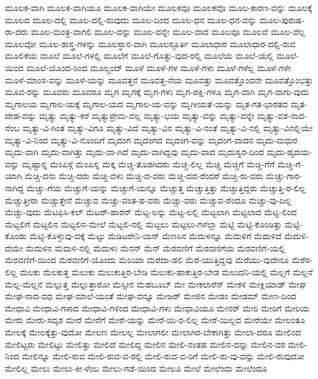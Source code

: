 {ಮೂಲಕ-ವಾಗಿ
ಮೂಲಕ-ವಾಗಿಯೂ
ಮೂಲಕ-ವಾಗಿಯೇ
ಮೂಲಕವೂ
ಮೂಲಕವೊ
ಮೂಲ-ಕಾರಣ-ವನ್ನು
ಮೂಲಕ್ಕೆ
ಮೂಲದ
ಮೂಲ-ದಲ್ಲಿ
ಮೂಲ-ದಲ್ಲಿ-ರುವುದು
ಮೂಲ-ದಿಂದ
ಮೂಲ-ಧನ
ಮೂಲ-ಧನ-ವನ್ನು
ಮೂಲ-ಪುರುಷ-ರಾ-ದರು
ಮೂಲ-ಮಂತ್ರ-ವಾಗಲಿ
ಮೂಲ-ವನ್ನು
ಮೂಲ-ವನ್ನೇ
ಮೂಲ-ವಾದ
ಮೂಲವೂ
ಮೂಲವೆ
ಮೂಲ-ವೆಲ್ಲ
ಮೂಲವೋ
ಮೂಲ-ಶಾಸ್ತ್ರ-ಗಳನ್ನು
ಮೂಲಸ್ಥಾನ-ವಾಗಿ
ಮೂಲಸ್ಫೂರ್ತಿ
ಮೂಲಾಧಾರ
ಮೂಲಾಧಾರ-ದಲ್ಲಿ-ರುವ
ಮೂಲಿಕೆಯ
ಮೂಲೆ
ಮೂಲೆ-ಗಳಲ್ಲಿ
ಮೂಲೆಗೆ
ಮೂಲೆ-ಗೊತ್ತು-ವುದ-ರಲ್ಲಿ
ಮೂಲೆಯ
ಮೂಲೆ-ಯಲ್ಲಿ
ಮೂಲೆ-ಯಿಂದ
ಮೂಲೆ-ಯೊಂದ-ರಿಂದ
ಮೂಲ್ಚಂದ್
ಮೂಳೆ
ಮೂಳೆ-ಗಳ
ಮೂಳೆ-ಗಳು
ಮೂಳೆ-ಗಳೆಲ್ಲ
ಮೂಳೆ-ಗಳೇ
ಮೂಳೆ-ಮಾಂಸ-ವನ್ನು
ಮೂಳೆ-ಯನ್ನು
ಮೂವತ್ತನೆ
ಮೂವತ್ತ-ನೆಯ
ಮೂವತ್ತು
ಮೂವತ್ತೊಂದನೇ
ಮೂವತ್ತೊಂಭತ್ತು
ಮೂವ-ರನ್ನು
ಮೂವರು
ಮೂವರೂ
ಮೃಗ
ಮೃಗಕ್ಕೆ
ಮೃಗ-ಗಳು
ಮೃಗ-ಪಕ್ಷಿ-ಗಳೂ
ಮೃಗ-ವಾಗಿ
ಮೃಗ-ವಾಗು-ವುದು
ಮೃಗಾಲಯ
ಮೃಗಾಲ-ಯಕ್ಕೆ
ಮೃಗಾಲ-ಯದ
ಮೃಗಾಲ-ಯ-ವನ್ನು
ಮೃಗೀಯತೆ-ಯನ್ನು
ಮೃತ-ಗತ-ಭಾರತದ
ಮೃತ-ದೇಹ-ವನ್ನು
ಮೃತ್ಯು
ಮೃತ್ಯು-ಕರೆ
ಮೃತ್ಯುಪ್ರೇಮ-ವಲ್ಲ
ಮೃತ್ಯು-ಭಯ
ಮೃತ್ಯು-ವನ್ನು
ಮೃತ್ಯು-ವನ್ನೇ
ಮೃತ್ಯು-ವಶ-ನಾದ-ನೆಂಬ
ಮೃತ್ಯು-ವಿ-ಗಿಂತ
ಮೃತ್ಯು-ವಿಗೂ
ಮೃತ್ಯು-ವಿದೆ
ಮೃತ್ಯು-ವಿನ
ಮೃತ್ಯು-ವಿ-ನಂತೆ
ಮೃತ್ಯು-ವಿ-ನಲ್ಲಿ
ಮೃತ್ಯು-ವಿನಲ್ಲಿಯೇ
ಮೃತ್ಯು-ವಿ-ನಿಂದ
ಮೃತ್ಯು-ವಿ-ನೊಂದಿಗೆ
ಮೃದಂಗ
ಮೃದಂಗದ
ಮೃದಂಗ-ವನ್ನು
ಮೃದಂಗ-ವಾದನ
ಮೃದು-ಮಧುರ
ಮೃದು-ವಾಗಿ
ಮೃದು-ವಾಗಿತ್ತು
ಮೃದು-ವಾ-ಗಿದೆ
ಮೃದು-ವಾಗಿದ್ದವು
ಮೃದು-ವಾದ
ಮೃದುಸ್ವರ-ದಿಂದ
ಮೃದು-ಹೃದಯ-ವನ್ನು
ಮೃಷ್ಟಾನ್ನ
ಮೆಂಪಿಸ್ಗೆ
ಮೆಂಪಿಸ್ನ
ಮೆಕ್ಕ
ಮೆಚ್ಚ-ತೊಡಗಿದರು
ಮೆಚ್ಚ-ಲಿಲ್ಲ
ಮೆಚ್ಚಿ
ಮೆಚ್ಚಿಗೆ
ಮೆಚ್ಚಿ-ಗೆಗೆ
ಮೆಚ್ಚಿ-ಗೆ-ಯಾಗಿ
ಮೆಚ್ಚಿ-ದನು
ಮೆಚ್ಚಿ-ದರು
ಮೆಚ್ಚಿ-ದಳು
ಮೆಚ್ಚಿ-ದ-ವರು
ಮೆಚ್ಚಿ-ದವ-ರೆಂದರೆ
ಮೆಚ್ಚಿ-ರು-ವರು
ಮೆಚ್ಚು-ಗಾರ-ನಾಗಿದ್ದ
ಮೆಚ್ಚು-ಗೆಯ
ಮೆಚ್ಚುಗೆ-ಯನ್ನು
ಮೆಚ್ಚುಗೆ-ಯನ್ನೂ
ಮೆಚ್ಚುತ್ತ
ಮೆಚ್ಚುತ್ತಿತ್ತು
ಮೆಚ್ಚುತ್ತಿದ್ದರು
ಮೆಚ್ಚುತ್ತಿ-ರ-ಲಿಲ್ಲ
ಮೆಚ್ಚುತ್ತೀರಾ
ಮೆಚ್ಚುತ್ತೇನೆ
ಮೆಚ್ಚುವ
ಮೆಚ್ಚು-ವಂತ-ಹ-ವರು
ಮೆಚ್ಚು-ವರು
ಮೆಚ್ಚುವ-ರೆಂದೂ
ಮೆಚ್ಚು-ವು-ದಿಲ್ಲ
ಮೆಚ್ಚು-ವುದು
ಮೆಟಫಿಸಿ-ಕಲ್
ಮೆಟರ್-ಹಾರನ್
ಮೆಟ್ಟ-ಲನ್ನು
ಮೆಟ್ಟ-ಲಲ್ಲಿ
ಮೆಟ್ಟಲಾಗಿ
ಮೆಟ್ಟಲಾದ
ಮೆಟ್ಟ-ಲಿಂದ
ಮೆಟ್ಟಲಿಗೆ
ಮೆಟ್ಟಲಿನ
ಮೆಟ್ಟಲಿನ-ಮೇಲೆ
ಮೆಟ್ಟಲಿ-ನಲ್ಲಿ
ಮೆಟ್ಟಲು
ಮೆಟ್ಟಲು-ಗಳೆಲ್ಲಾ
ಮೆಟ್ಟಿ
ಮೆಟ್ಟಿ-ಕೊಂಡಿತ್ತು
ಮೆಟ್ಟಿ-ಕೊಂಡು
ಮೆಟ್ಟಿ-ಕೊಳ್ಳುವು-ದಕ್ಕೆ
ಮೆಟ್ಟು
ಮೆಡಿಟರೇನಿ-ಯನ್
ಮೆಣಸಿನ
ಮೆದುಳನ್ನೂ
ಮೆದುಳಿಗೆ
ಮೆದುಳಿದೆ
ಮೆದುಳಿ-ದೆಯೇ
ಮೆದುಳಿನ
ಮೆದುಳಿ-ನಲ್ಲಿ
ಮೆದುಳು
ಮೆನನ್
ಮೆನ್
ಮೆರವಣಿಗೆ
ಮೆರವಣಿಗೆಯ
ಮೆರವಣಿಗೆ-ಯಲ್ಲಿ
ಮೆರವಣಿಗೆ-ಯಿಂದ
ಮೆರವಣಿಗೆ-ಯೊಂದು
ಮೆರಿಯಾ
ಮೆರೆದಾ-ಡಲಿ
ಮೆರೆ-ಯುತ್ತಿದ್ದವು
ಮೆರೆಯು-ವುದೇನೂ
ಮೆರೆಸ-ಲಿಲ್ಲ
ಮೆಲಕು
ಮೆಲಕುತ್ತ
ಮೆಲುಕು
ಮೆಲುಕುತ್ತಿರ-ಬೇಡಿ
ಮೆಲುಕು-ಹಾಕುತ್ತಿರ-ಬೇಡ
ಮೆಲುದನಿ-ಯಲ್ಲಿ
ಮೆಲ್ಲಗೆ
ಮೆಲ್ಲನೆ
ಮೆಲ್ಲ-ಮೆಲ್ಲನೆ
ಮೆಲ್ಲುತ್ತ
ಮೆಲ್ಲುತ್ತಾರೋ
ಮೆಸ್ಸೀನ
ಮೆಹಬೂಬ್
ಮೇ
ಮೇಕಲಾರೆನ್
ಮೇಕಳಿ
ಮೇಕ್ಲಿಯಾಡ್
ಮೇಘ
ಮೇಘ-ನಾದ-ವಧ
ಮೇಘ-ಮಾಲೆ-ಯಂತೆ
ಮೇಘ-ವನ್ನೂ
ಮೇಜರ್
ಮೇಜಿನ
ಮೇಡಂ
ಮೇಡಮ್
ಮೇಣ-ದಿಂದ
ಮೇಧಾವಿ
ಮೇಧಾವಿ-ಗಳಾದ
ಮೇಧಾವಿ-ಗಳಿಂದ
ಮೇಧಾವಿ-ಗಳು
ಮೇಧಾವಿಯೂ
ಮೇನರ್
ಮೇರಿ
ಮೇರಿಗೆ
ಮೇರಿಯ
ಮೇರು
ಮೇರು-ಸದೃಶ
ಮೇರೆ
ಮೇರೆಗೆ
ಮೇರೆ-ಯನ್ನು
ಮೇರೆ-ಯಿ-ರ-ಲಿಲ್ಲ
ಮೇರೆ-ಯಿಲ್ಲದ
ಮೇರೆಯೇ
ಮೇಲಂತೂ
ಮೇಲಕ್ಕೆ
ಮೇಲಕ್ಕೆತ್ತು-ವುದೋ
ಮೇಲಣ
ಮೇಲಲ್ಲ
ಮೇಲಾಗಲೀ
ಮೇಲಾಗಿರ-ಬೇಕಾಗಿತ್ತು
ಮೇಲಾ-ದರೂ
ಮೇಲಿಂದ
ಮೇಲಿಟ್ಟರು
ಮೇಲಿಟ್ಟು
ಮೇಲಿತ್ತು
ಮೇಲಿದೆ
ಮೇಲಿದ್ದ
ಮೇಲಿನ
ಮೇಲಿ-ನಂತಹ
ಮೇಲಿನ-ದನ್ನು
ಮೇಲಿನ-ವರ
ಮೇಲಿ-ನಿಂದ
ಮೇಲಿನ್ನೂ
ಮೇಲಿ-ರುವ
ಮೇಲಿ-ರುವ-ವ-ರಲ್ಲಿ
ಮೇಲಿ-ರುವ-ವ-ರಿಗೆ
ಮೇಲಿ-ರು-ವು-ದನ್ನು
ಮೇಲಿ-ರುವುದೋ
ಮೇಲಿಲ್ಲ
ಮೇಲು
ಮೇಲು-ಕೀ-ಳೆಂಬ
ಮೇಲು-ಗಡೆ-ಯಿಂದ
ಮೇಲೂ
ಮೇಲೆ
ಮೇಲೆಂದು
ಮೇಲೆಂದೂ
}
